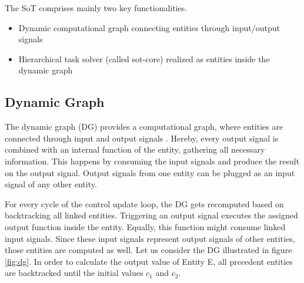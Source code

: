 The SoT comprises mainly two key functionalities. 
\begin{itemize}
\item Dynamic computational graph connecting entities through input/output signals
\item Hierarchical task solver (called sot-core) realized as entities inside the dynamic graph
\end{itemize}

\subsection{Dynamic Graph}
The dynamic graph (DG) provides a computational graph, where entities are connected through input and output signals \cite{mansard:icar:09}. Hereby, every output signal is combined with an internal function of the entity, gathering all necessary information. This happens by consuming the input signals and produce the result on the output signal. Output signals from one entity can be plugged as an input signal of any other entity. 

For every cycle of the control update loop, the DG gets recomputed based on backtracking all linked entities. Triggering an output signal executes the assigned output function inside the entity. Equally, this function might consume linked input signals. Since these input signals represent output signals of other entities, those entities are computed as well. Let us consider the DG illustrated in figure \ref{fig:dg}. In order to calculate the output value of Entity E, all precedent entities are backtracked until the initial values $c_1$ and $c_2$. 

